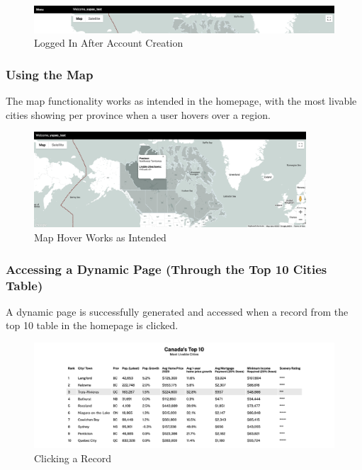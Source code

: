 \documentclass[12pt, letterpaper]{article}
\begin{document}
 \begin{figure}[htbp]
	\centering
	\includegraphics[width=\textwidth]{images/30-journey-e02b.png}
	\caption{Logged In After Account Creation}
 \end{figure}

\subsubsection*{Using the Map}
The map functionality works as intended in the homepage, with the most livable cities showing per province when a user hovers over a region.

\begin{figure}[htbp]
	\centering
	\includegraphics[width=4in]{images/30-journey-e03.png}
	\caption{Map Hover Works as Intended}
 \end{figure}

\newpage
 \subsubsection*{Accessing a Dynamic Page (Through the Top 10 Cities Table)}
A dynamic page is successfully generated and accessed when a record from the top 10 table in the homepage is clicked.

\begin{figure}[htbp]
	\centering
	\includegraphics[width=\textwidth]{images/30-journey-e04a.png}
	\caption{Clicking a Record}
 \end{figure}
\end{document}
